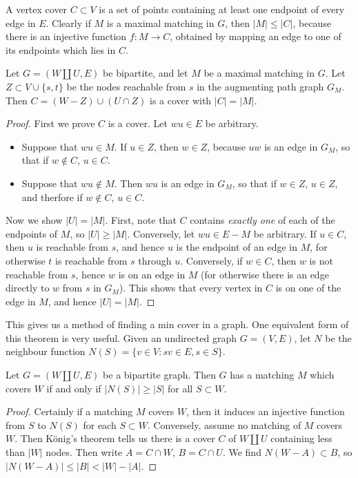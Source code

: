 A vertex cover $C \subset V$ is a set of points containing at least one endpoint of every edge in $E$. Clearly if $M$ is a maximal matching in $G$, then $|M| \leq |C|$, because there is an injective function $f:M \to C$, obtained by mapping an edge to one of its endpoints which lies in $C$.

\begin{theorem}
    Let $G = (W \amalg U, E)$ be bipartite, and let $M$ be a maximal matching in $G$. Let $Z \subset V \cup \{ s, t \}$ be the nodes reachable from $s$ in the augmenting path graph $G_M$. Then $C = (W - Z) \cup (U \cap Z)$ is a cover with $|C| = |M|$.
\end{theorem}
\begin{proof}
    First we prove $C$ is a cover. Let $wu \in E$ be arbitrary.
    \begin{itemize}
        \item Suppose that $wu \in M$. If $u \in Z$, then $w \in Z$, because $uw$ is an edge in $G_M$, so that if $w \not \in C$, $u \in C$. \item Suppose that $wu \not \in M$. Then $wu$ is an edge in $G_M$, so that if $w \in Z$, $u \in Z$, and therfore if $w \not \in C$, $u \in C$.
    \end{itemize}
    Now we show $|U| = |M|$. First, note that $C$ contains {\it exactly one} of each of the endpoints of $M$, so $|U| \geq |M|$. Conversely, let $wu \in E - M$ be arbitrary. If $u \in C$, then $u$ is reachable from $s$, and hence $u$ is the endpoint of an edge in $M$, for otherwise $t$ is reachable from $s$ through $u$. Conversely, if $w \in C$, then $w$ is not reachable from $s$, hence $w$ is on an edge in $M$ (for otherwise there is an edge directly to $w$ from $s$ in $G_M$). This shows that every vertex in $C$ is on one of the edge in $M$, and hence $|U| = |M|$.
\end{proof}

This gives us a method of finding a min cover in a graph. One equivalent form of this theorem is very useful. Given an undirected graph $G = (V,E)$, let $N$ be the neighbour function $N(S) = \{ v \in V : sv \in E, s \in S \}$.

\begin{theorem}[Hall]
    Let $G = (W \amalg U, E)$ be a bipartite graph. Then $G$ has a matching $M$ which covers $W$ if and only if $|N(S)| \geq |S|$ for all $S \subset W$.
\end{theorem}
\begin{proof}
    Certainly if a matching $M$ covers $W$, then it induces an injective function from $S$ to $N(S)$ for each $S \subset W$. Conversely, assume no matching of $M$ covers $W$. Then K\"{o}nig's theorem tells us there is a cover $C$ of $W \amalg U$ containing less than $|W|$ nodes. Then write $A = C \cap W$, $B = C \cap U$. We find $N(W - A) \subset B$, so $|N(W-A)| \leq |B| < |W| - |A|$.
\end{proof}

